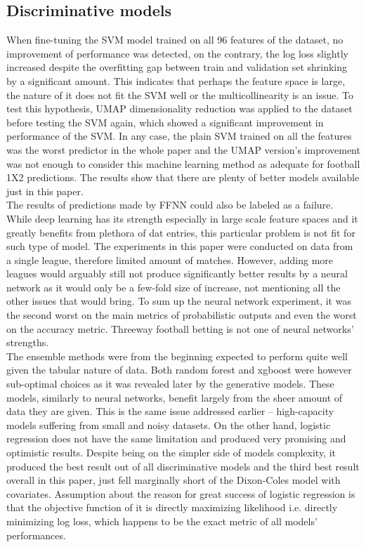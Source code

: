 \documentclass{article}
\begin{document}
\subsection{Discriminative models}
When fine-tuning the SVM model trained on all 96 features of the dataset, no improvement of performance was detected, on the contrary, the log loss slightly increased despite the overfitting gap between train and validation set shrinking by a significant amount. This indicates that perhaps the feature space is large, the nature of it does not fit the SVM well or the multicollinearity is an issue. To test this hypothesis, UMAP dimensionality reduction was applied to the dataset before testing the SVM again, which showed a significant improvement in performance of the SVM. In any case, the plain SVM trained on all the features was the worst predictor in the whole paper and the UMAP version's improvement was not enough to consider this machine learning method as adequate for football 1X2 predictions. The results show that there are plenty of better models available just in this paper.
\\
The results of predictions made by FFNN could also be labeled as a failure. While deep learning has its strength especially in large scale feature spaces and it greatly benefits from plethora of dat entries, this particular problem is not fit for such type of model. The experiments in this paper were conducted on data from a single league, therefore limited amount of matches. However, adding more leagues would arguably still not produce significantly better results by a neural network as it would only be a few-fold size of increase, not mentioning all the other issues that would bring. To sum up the neural network experiment, it was the second worst on the main metrics of probabilistic outputs and even the worst on the accuracy metric. Threeway football betting is not one of neural networks' strengths.
\\
The ensemble methods were from the beginning expected to perform quite well given the tabular nature of data. Both random forest and xgboost were however sub-optimal choices as it was revealed later by the generative models. These models, similarly to neural networks, benefit largely from the sheer amount of data they are given. This is the same issue addressed earlier -- high-capacity models suffering from small and noisy datasets. On the other hand, logistic regression does not have the same limitation and produced very promising and optimistic results. Despite being on the simpler side of models complexity, it produced the best result out of all discriminative models and the third best result overall in this paper, just fell marginally short of the Dixon-Coles model with covariates. Assumption about the reason for great success of logistic regression is that the objective function of it is directly maximizing likelihood i.e. directly minimizing log loss, which happens to be the exact metric of all models' performances.
\end{document}
